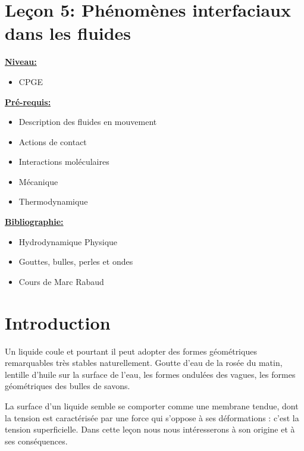 \documentclass[french, a4paper, 10pt, twocolumn, landscape]{article}
\begin{document}
\section*{Leçon 5: Phénomènes interfaciaux dans les fluides}



\noindent\underline{\textbf{Niveau:}}
\begin{itemize}
  \item CPGE 
\end{itemize}
\underline{\textbf{Pr{\'e}-requis: }}

\begin{itemize}
  \item Description des fluides en mouvement
  
  \item Actions de contact
  
  \item Interactions mol{\'e}culaires
  
  \item M{\'e}canique
  
  \item Thermodynamique
\end{itemize}
\underline{\textbf{Bibliographie:}}

\begin{itemize}
  \item Hydrodynamique Physique
  
  \item Gouttes, bulles, perles et ondes
  
  \item Cours de Marc Rabaud
\end{itemize}



\section*{Introduction}

Un liquide coule et pourtant il peut adopter des formes g{\'e}om{\'e}triques
remarquables tr{\`e}s stables naturellement. Goutte d'eau de la ros{\'e}e du
matin, lentille d'huile sur la surface de l'eau, les formes ondul{\'e}es des
vagues, les formes g{\'e}om{\'e}triques des bulles de savons.\medskip

La surface d'un liquide semble se comporter comme une membrane tendue, dont
la tension est caract{\'e}ris{\'e}e par une force qui s'oppose {\`a} ses
d{\'e}formations : c'est la tension superficielle. Dans cette le{\c c}on nous
nous int{\'e}resserons {\`a} son origine et {\`a} ses cons{\'e}quences.
\end{document}

